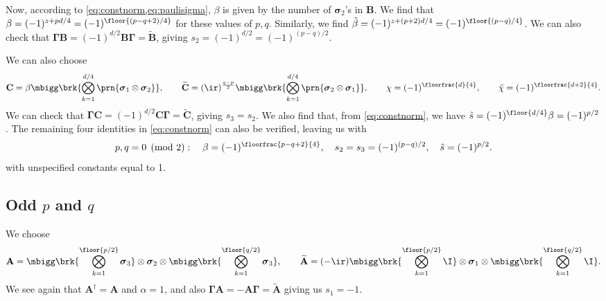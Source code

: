 \documentclass[11pt]{article}
\newcommand{\Gammab}{\boldsymbol{\Gamma}}
\newcommand{\A}{\mathbf{A}}
\newcommand{\B}{\mathbf{B}}
\renewcommand{\C}{\mathbf{C}}
\newcommand{\At}{\widetilde{\A}}
\newcommand{\Bt}{\widetilde{\B}}
\newcommand{\Ct}{\widetilde{\C}}
\newcommand{\sigmab}{\boldsymbol{\sigma}}
\newcommand{\betat}{\tilde{\beta}}
\newcommand{\chit}{\tilde{\chi}}
\begin{document}
Now, according to \cref{eq:constnorm,eq:paulisigma}, $\beta$ is given by the number of $\sigmab_2$'s in $\B$.
We find that \( \beta = (-1)^{z + pd/4} = (-1)^{\floor{(p-q+2)/4}} \) for these values of \(p,q\).
Similarly, we find \( \betat = (-1)^{z + (p+2)d/4} = (-1)^{\floor{(p-q)/4}} \).
We can also check that $\Gammab \B = (-1)^{d/2}\B \Gammab = \Bt$, giving $s_2 = (-1)^{d/2} = (-1)^{(p-q)/2}$.

We can also choose
%
\begin{equation*}
  \C =  \beta \mbigg\brk{\bigotimes_{k=1}^{d/4} \prn{\sigmab_1 \otimes \sigmab_2}},
  \qquad
  \Ct = (\ir)^{\frac{q-p}{2}}
        \mbigg\brk{\bigotimes_{k=1}^{d/4} \prn{\sigmab_2 \otimes \sigmab_1}},
  \qquad
  \chi = (-1)^{\floorfrac{d}{4}},
  \qquad
  \chit = (-1)^{\floorfrac{d+2}{4}}.
\end{equation*}
%
We can check that $\Gammab \C = (-1)^{d/2}\C \Gammab = \Ct$, giving $s_3 = s_2$.
We also find that, from \cref{eq:constnorm}, we have
\( \hat{s} = (-1)^{\floor{d/4}} \beta = (-1)^{p/2} \).
The remaining four identities in \cref{eq:constnorm} can also be verified, leaving us with
%
\begin{equation}\label{eq:consteveneven}
  p, q = 0 \pmod 2 : \quad
  \beta = (-1)^{\floorfrac{p-q+2}{4}}, \quad
  s_2 = s_3 = (-1)^{(p-q)/2}, \quad
  \hat{s} = (-1)^{p/2}.
\end{equation}
%
with unspecified constants equal to 1.


\subsection{Odd \texorpdfstring{$p$ and $q$}{p and q}}\label{sec:oddodd}

We choose
%
\begin{equation*}
  \A =  \mbigg\brk{\bigotimes_{k=1}^{\floor{p/2}} \sigmab_3}
        \otimes \sigmab_2
        \otimes \mbigg\brk{\bigotimes_{k=1}^{\floor{q/2}} \sigmab_3},
  \qquad
  \At = (-\ir)
        \mbigg\brk{\bigotimes_{k=1}^{\floor{p/2}} \I}
        \otimes \sigmab_1
        \otimes \mbigg\brk{\bigotimes_{k=1}^{\floor{q/2}} \I}.
\end{equation*}
%
We see again that $\A^\dag = \A$ and $\alpha=1$, and also $\Gammab \A = - \A \Gammab =  \At$ giving us $s_1 = -1$.
\end{document}
